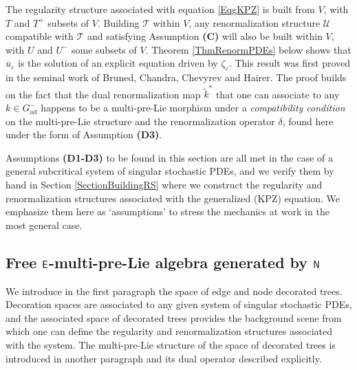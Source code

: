 \documentclass[10pt, reqno]{amsart}
\numberwithin{subsection}{section}
\numberwithin{subsubsection}{subsection}
\numberwithin{equation}{section} %
\theoremstyle{mystyle}
\theoremstyle{mystyle2}
\theoremstyle{mystyle3}
\newcommand{\ssk}{\smallskip}
\renewcommand{\epsilon}{\varepsilon}
\begin{document}
\ssk

 The regularity structure associated with equation \eqref{EqgKPZ} is built from $V$, with $T$ and $T^+$ subsets of $V$. Building $\mathscr{T}$ within $V$, any renormalization structure $\mathscr{U}$ compatible with $\mathscr{T}$ and satisfying Assumption \textbf{\textsf{(C)}} will also be built within $V$, with $U$ and $U^-$ some subsets of $V$. Theorem \ref{ThmRenormPDEs} below shows that $\overline{u}_\epsilon$ is the solution of an explicit equation driven by $\zeta_\epsilon$. This result was first proved in the seminal work \cite{BCCH18} of Bruned, Chandra, Chevyrev and Hairer. The proof builds on the fact that the dual renormalization map $\widetilde{k}^*$ that one can associate to any $k\in G^-_\textrm{ad}$ happens to be a multi-pre-Lie morphism under a {\it compatibility condition} on the multi-pre-Lie structure and the renormalization operator $\delta$, found here under the form of Assumption \textbf{\textsf{(D3)}}. 

\medskip

Assumptions \textbf{\textsf{(D1-D3)}} to be found in this section are 
all met in the case of a general subcritical system of singular stochastic PDEs, and we verify them by hand in Section \ref{SectionBuildingRS} where we construct the regularity and renormalization structures associated with the generalized (KPZ) equation. We emphasize them here as `assumptions' to stress the mechanics at work in the most general case.   



\bigskip



\subsection{Free $\sf E$-multi-pre-Lie algebra generated by $\sf N$}
\label{SectionMultiPreLie}

We introduce in the first paragraph the space of edge and node decorated trees. Decoration spaces are associated to any given system of singular stochastic PDEs, and the associated space of decorated trees provides the background scene from which one can define the regularity and renormalization structures associated with the system. The multi-pre-Lie structure of the space of decorated trees is introduced in another paragraph and its dual operator described explicitly.  
\end{document}
